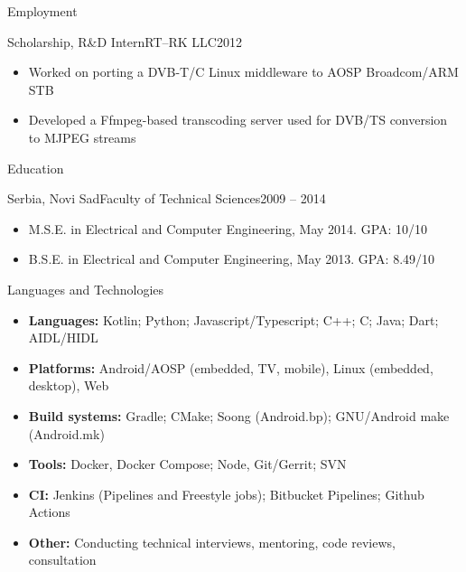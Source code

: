 \documentclass[]{mcdowellcv}
\begin{document}
\begin{cvsection}{Employment}
		\begin{cvsubsection}{Scholarship, R\&D Intern}{RT--RK LLC}{2012}
			\begin{itemize}
				\item Worked on porting a DVB-T/C Linux middleware to AOSP Broadcom/ARM STB
				\item Developed a Ffmpeg-based transcoding server used for DVB/TS conversion to MJPEG streams
			\end{itemize}
		\end{cvsubsection}

	\end{cvsection}

	\begin{cvsection}{Education}
		\begin{cvsubsection}{Serbia, Novi Sad}{Faculty of Technical Sciences}{2009 -- 2014}
			\begin{itemize}
				\item M.S.E. in Electrical and Computer Engineering, May 2014. GPA: 10/10
				\item B.S.E. in Electrical and Computer Engineering, May 2013. GPA: 8.49/10
			\end{itemize}
		\end{cvsubsection}
	\end{cvsection}

	\begin{cvsection}{Languages and Technologies}
		\begin{cvsubsection}{}{}{}
			\begin{itemize}
				\item \textbf{Languages:} Kotlin; Python; Javascript/Typescript; C++; C; Java; Dart; AIDL/HIDL
				\item \textbf{Platforms:} Android/AOSP (embedded, TV, mobile), Linux (embedded, desktop), Web
				\item \textbf{Build systems:} Gradle; CMake; Soong (Android.bp); GNU/Android make (Android.mk)
				\item \textbf{Tools:}  Docker, Docker Compose; Node, Git/Gerrit; SVN
				\item \textbf{CI:} Jenkins (Pipelines and Freestyle jobs); Bitbucket Pipelines; Github Actions
				\item \textbf{Other:} Conducting technical interviews, mentoring, code reviews, consultation
			\end{itemize}
		\end{cvsubsection}
	\end{cvsection}
\end{document}
